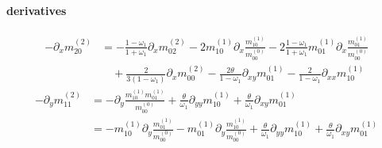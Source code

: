 \documentclass{article}
\begin{document}
  \paragraph{derivatives}
  \begin{equation}
    \tag{C5}
    \begin{aligned}
      - \partial_x m_{20}^{(2)} &=
      - \frac{1-\omega_1}{1+\omega_1} \partial_x m_{02}^{(2)}
      - 2 m_{10}^{(1)} \partial_x \frac{ m_{10}^{(1)} }{m_{00}^{(0)}}
      - 2 \frac{1-\omega_1}{1+\omega_1} m_{01}^{(1)}\partial_x\frac{m_{01}^{(1)}}{m_{00}^{(0)}}
      \\&\quad
      + \frac{ 2}{3(1-\omega_1)} \partial_x m_{00}^{(2)}
      - \frac{2\theta}{1-\omega_1}\partial_{xy} m_{01}^{(1)}
      - \frac{2}{1-\omega_1}\partial_{xx} m_{10}^{(1)}
    \end{aligned}
  \end{equation}
  \begin{equation}
    \tag{C6}
    \begin{aligned}
    -\partial_y m_{11}^{(2)} &=  -\partial_y \frac{ m_{10}^{(1)}m_{01}^{(1)}}{m_{00}^{(0)}}
    + \frac{\theta}{\omega_1}\partial_{yy} m_{10}^{(1)} + \frac{\theta}{\omega_1}\partial_{xy} m_{01}^{(1)}
    \\&=
    -m_{10}^{(1)}\partial_y \frac{ m_{01}^{(1)}}{m_{00}^{(0)}}
    -m_{01}^{(1)}\partial_y \frac{ m_{10}^{(1)}}{m_{00}^{(0)}}
    + \frac{\theta}{\omega_1}\partial_{yy} m_{10}^{(1)}
    + \frac{\theta}{\omega_1}\partial_{xy} m_{01}^{(1)}
    \end{aligned}
  \end{equation}

  \pagebreak
\end{document}
